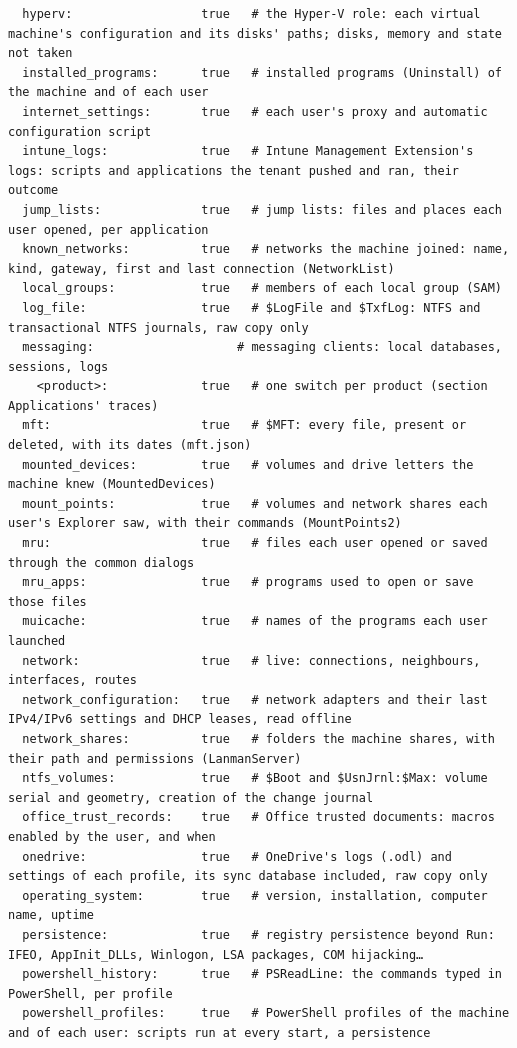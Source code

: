 \documentclass[11pt,a4paper,oneside]{report}
\begin{document}
\begin{lstlisting}
  hyperv:                  true   # the Hyper-V role: each virtual machine's configuration and its disks' paths; disks, memory and state not taken
  installed_programs:      true   # installed programs (Uninstall) of the machine and of each user
  internet_settings:       true   # each user's proxy and automatic configuration script
  intune_logs:             true   # Intune Management Extension's logs: scripts and applications the tenant pushed and ran, their outcome
  jump_lists:              true   # jump lists: files and places each user opened, per application
  known_networks:          true   # networks the machine joined: name, kind, gateway, first and last connection (NetworkList)
  local_groups:            true   # members of each local group (SAM)
  log_file:                true   # $LogFile and $TxfLog: NTFS and transactional NTFS journals, raw copy only
  messaging:                    # messaging clients: local databases, sessions, logs
    <product>:             true   # one switch per product (section Applications' traces)
  mft:                     true   # $MFT: every file, present or deleted, with its dates (mft.json)
  mounted_devices:         true   # volumes and drive letters the machine knew (MountedDevices)
  mount_points:            true   # volumes and network shares each user's Explorer saw, with their commands (MountPoints2)
  mru:                     true   # files each user opened or saved through the common dialogs
  mru_apps:                true   # programs used to open or save those files
  muicache:                true   # names of the programs each user launched
  network:                 true   # live: connections, neighbours, interfaces, routes
  network_configuration:   true   # network adapters and their last IPv4/IPv6 settings and DHCP leases, read offline
  network_shares:          true   # folders the machine shares, with their path and permissions (LanmanServer)
  ntfs_volumes:            true   # $Boot and $UsnJrnl:$Max: volume serial and geometry, creation of the change journal
  office_trust_records:    true   # Office trusted documents: macros enabled by the user, and when
  onedrive:                true   # OneDrive's logs (.odl) and settings of each profile, its sync database included, raw copy only
  operating_system:        true   # version, installation, computer name, uptime
  persistence:             true   # registry persistence beyond Run: IFEO, AppInit_DLLs, Winlogon, LSA packages, COM hijacking…
  powershell_history:      true   # PSReadLine: the commands typed in PowerShell, per profile
  powershell_profiles:     true   # PowerShell profiles of the machine and of each user: scripts run at every start, a persistence

\end{lstlisting}
\end{document}
